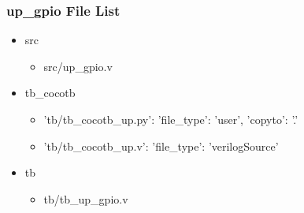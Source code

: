 \subsubsection{up\_gpio File List}
\begin{itemize}
\item src
	\begin{itemize}
	\item src/up\_gpio.v
	\end{itemize}
\item tb\_cocotb
	\begin{itemize}
	\item {'tb/tb\_cocotb\_up.py': {'file\_type': 'user', 'copyto': '.'}}
	\item {'tb/tb\_cocotb\_up.v': {'file\_type': 'verilogSource'}}
	\end{itemize}
\item tb
	\begin{itemize}
	\item tb/tb\_up\_gpio.v
	\end{itemize}
\end{itemize}
